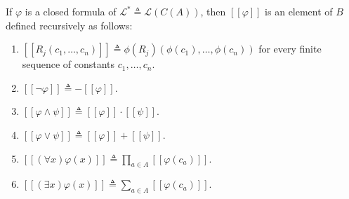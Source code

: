 If $\varphi$ is a closed formula of $\mathcal{L}^* \triangleq \mathcal{L}(C(A))$, then $[\![\varphi]\!]$ is an element of $B$ defined recursively as follows:
\begin{enumerate}
\item $[\![R_j(c_1, \ldots, c_n)]\!] \triangleq \phi(R_j)(\phi(c_1), \ldots, \phi(c_n))$ for every finite sequence of constants $c_1, \ldots, c_n$.
\item $[\![\neg \varphi]\!] \triangleq -[\![\varphi]\!]$.
\item $[\![\varphi \land \psi]\!] \triangleq [\![\varphi]\!] \cdot [\![\psi]\!]$.
\item $[\![\varphi \lor \psi]\!] \triangleq [\![\varphi]\!] + [\![\psi]\!]$.
\item $[\![(\forall x)\varphi(x)]\!] \triangleq \prod_{a \in A} [\![\varphi(c_a)]\!]$.
\item $[\![(\exists x)\varphi(x)]\!] \triangleq \sum_{a \in A} [\![\varphi(c_a)]\!]$.
\end{enumerate}
